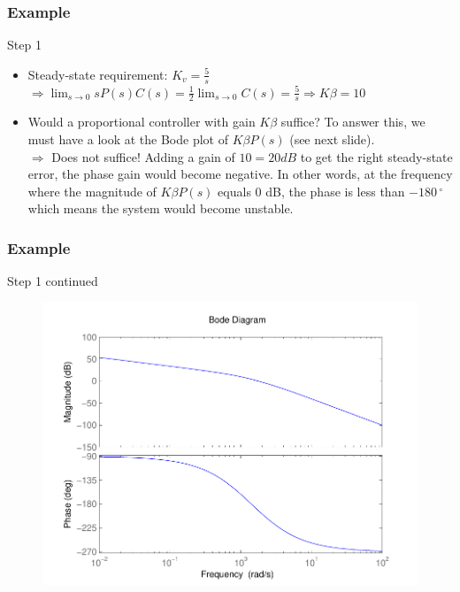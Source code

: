 \begin{frame}
\frametitle{Example}
\begin{block}{Step 1}
	\begin{itemize}
	\item Steady-state requirement: $K_v = \frac{5}{s}$ \\
	$\Rightarrow \lim_{s \to 0} sP(s)C(s) = \frac{1}{2}\lim_{s \to 0} C(s) = \frac{5}{s} \Rightarrow K\beta = 10$
	\item Would a proportional controller with gain $K\beta$ suffice? To answer this, we must have a look at the Bode plot of $K\beta P(s)$ (see next slide). \\
	$\Rightarrow$ Does not suffice! Adding a gain of $10 = 20 dB$ to get the right steady-state error, the phase gain would become negative. In other words, at the frequency where the magnitude of $K\beta P(s)$ equals 0 dB, the phase is less than $-180\,^{\circ}$ which means the system would become unstable.
	\end{itemize}
\end{block}
\end{frame}

\begin{frame}
\frametitle{Example}
\begin{block}{Step 1 continued}
\begin{figure}
	\centering
	\includegraphics[width=0.5
	\linewidth]{bodeexamplelagpropnotgood}
\end{figure}	
\end{block}
\end{frame}

